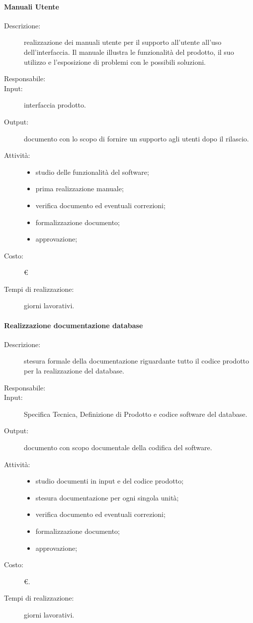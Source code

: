 \paragraph{Manuali Utente}
\begin{description}
\item[Descrizione:] realizzazione dei manuali utente per il supporto all'utente all'uso dell'interfaccia. Il manuale illustra le funzionalità del prodotto, il suo utilizzo e l'esposizione di problemi con le possibili soluzioni.
\item[Responsabile:] 
\item[Input:] interfaccia prodotto.
\item[Output:] documento con lo scopo di fornire un supporto agli utenti dopo il rilascio.
\item[Attività:]
\begin{itemize}
\item studio delle funzionalità del software;
\item prima realizzazione manuale;
\item verifica documento ed eventuali correzioni;
\item formalizzazione documento;
\item approvazione;
\end{itemize}
\item[Costo:] \euro{}
\item[Tempi di realizzazione:]  giorni lavorativi.
\end{description}

\paragraph{Realizzazione documentazione database}
\begin{description}
\item[Descrizione:] stesura formale della documentazione riguardante tutto il codice prodotto per la realizzazione del database.
\item[Responsabile:] 
\item[Input:] Specifica Tecnica, Definizione di Prodotto e codice software del database.
\item[Output:] documento con scopo documentale della codifica del software.
\item[Attività:]
\begin{itemize}
\item studio documenti in input e del codice prodotto;
\item stesura documentazione per ogni singola unità;
\item verifica documento ed eventuali correzioni;
\item formalizzazione documento;
\item approvazione;
\end{itemize}
\item[Costo:] \euro{}.
\item[Tempi di realizzazione:]  giorni lavorativi.
\end{description}

